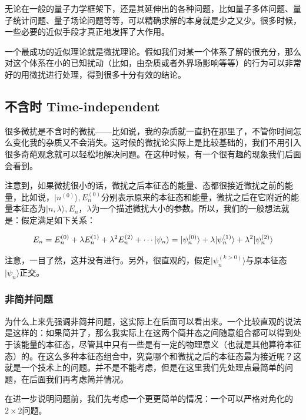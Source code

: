 
无论在一般的量子力学框架下，还是其延伸出的各种问题，比如量子多体问题、量子统计问题、量子场论问题等等，可以精确求解的本身就是少之又少。很多时候，一些必要的近似手段才真正地发挥了大作用。

一个最成功的近似理论就是微扰理论。假如我们对某一个体系了解的很充分，那么对这个体系在小的已知扰动（比如，由杂质或者外界场影响等等）的行为可以非常好的用微扰进行处理，得到很多十分有效的结论。

\subsection{不含时 Time-independent}

很多微扰是不含时的微扰——比如说，我的杂质就一直扔在那里了，不管你时间怎么变化我的杂质又不会消失。这时候的微扰论实际上是比较基础的，我们不用引入很多奇葩观念就可以轻松地解决问题。在这种时候，有一个很有趣的现象我们后面会看到。

注意到，如果微扰很小的话，微扰之后本征态的能量、态都很接近微扰之前的能量，比如说，$|n^{(0)}\rangle, E_n^{(0)}$分别表示原来的本征态和能量，微扰之后在它附近的能量本征态为$|n,\lambda\rangle, E_n$，$\lambda$为一个描述微扰大小的参数。所以，我们的一般想法就是：假定满足如下关系：

\begin{equation}
E_n = E_n^{(0)} + \lambda E_n^{(1)} + \lambda^2 E_n^{(2)} + \cdots\\
|\psi_n\rangle = |\psi_n^{(0)}\rangle + \lambda|\psi_n^{(1)}\rangle + \lambda^2 |\psi_n^{(2)}\rangle
\end{equation}

注意，一目了然，这并没有进行。另外，很直观的，假定$|\psi_n^{(k>0)}\rangle$与原本征态$|\psi_n\rangle$正交。\\

\subsubsection{非简并问题}

为什么上来先强调非简并问题，这实际上在后面可以看出来。一个比较直观的说法是这样的：如果简并了，那么我实际上在这两个简并态之间随意组合都可以得到处于该能量的本征态，尽管其中只有一些是有一定的物理意义（也就是其他算符本征态）的。在这么多种本征态组合中，究竟哪个和微扰之后的本征态最为接近呢？这就是一个技术上的问题。并不是不能考虑，但是在这里我们先处理点最简单的问题，在后面我们再考虑简并情况。

在进一步说明问题前，我们先考虑一个更更简单的情况：一个可以严格对角化的$2\times2$问题。

